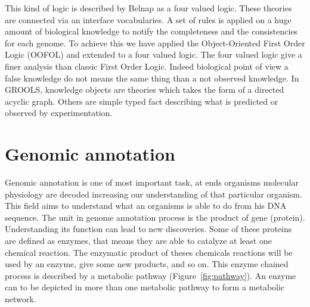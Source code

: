 \documentclass{llncs}
\begin{document}
This kind of logic is described by Belnap \cite{belnap1977useful} as a four valued logic. These theories are connected via an interface vocabularies. A set of rules is applied on a huge amount of biological knowledge to notify the completeness and the consistencies for each genome. To achieve this we have applied the Object-Oriented First Order Logic (OOFOL) \cite{amir1999object} and extended to a four valued logic. The four valued logic give a finer analysis than classic First Order Logic. Indeed biological point of view a false knowledge do not means the same thing than a not observed knowledge. In GROOLS, knowledge objects are theories which takes the form of a directed acyclic graph. Others are simple typed fact describing what is predicted or observed by experimentation.

\section{Genomic annotation}

Genomic annotation is one of most important task, at ends organisms molecular physiology are decoded increasing our understanding of that particular organism. This field aims to understand what an organisms is able to do from his DNA sequence. The unit in genome annotation process is the product of gene (protein). Understanding its function can lead to new discoveries. Some of these proteins are defined as enzymes, that means they are able to catalyze at least one chemical reaction. The enzymatic product of theses chemicals reactions will be used by an enzyme, give some new products, and so on. This enzyme chained process is described by a metabolic pathway (Figure~\ref{fig:pathway}). An enzyme can to be depicted in more than one metabolic pathway to form a metabolic network.
\end{document}
